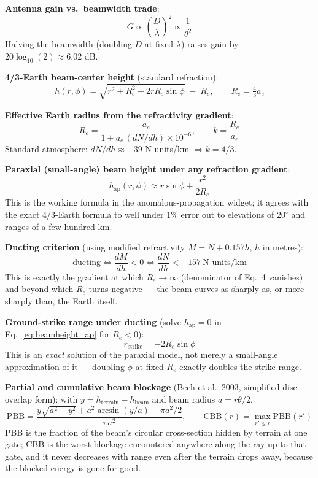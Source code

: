 \documentclass[11pt]{article}
\begin{document}
\textbf{Antenna gain vs.\ beamwidth trade}:
\begin{equation}
G \propto \left(\frac{D}{\lambda}\right)^2 \propto \frac{1}{\theta^2}
\end{equation}
Halving the beamwidth (doubling $D$ at fixed $\lambda$) raises gain by $20\log_{10}(2) \approx 6.02$ dB.

\textbf{4/3-Earth beam-center height} (standard refraction):
\begin{equation}
h(r,\phi) = \sqrt{r^2 + R_e^2 + 2 r R_e \sin\phi} \;-\; R_e, \qquad R_e = \tfrac{4}{3}a_e
\end{equation}

\textbf{Effective Earth radius from the refractivity gradient}:
\begin{equation}
R_e = \frac{a_e}{1 + a_e\,(dN/dh)\times 10^{-6}}, \qquad k = \frac{R_e}{a_e}
\end{equation}
Standard atmosphere: $dN/dh \approx -39$ N-units/km $\Rightarrow k = 4/3$.

\textbf{Paraxial (small-angle) beam height under any refraction gradient}:
\begin{equation}
h_{\mathrm{ap}}(r,\phi) \approx r\sin\phi + \frac{r^2}{2R_e}
\label{eq:beamheight_ap}
\end{equation}
This is the working formula in the anomalous-propagation widget; it agrees with the exact 4/3-Earth formula to well under $1\%$ error out to elevations of $20^\circ$ and ranges of a few hundred km.

\textbf{Ducting criterion} (using modified refractivity $M = N + 0.157h$, $h$ in metres):
\begin{equation}
\text{ducting} \iff \frac{dM}{dh} < 0 \iff \frac{dN}{dh} < -157\ \text{N-units/km}
\end{equation}
This is exactly the gradient at which $R_e \to \infty$ (denominator of Eq.~4 vanishes) and beyond which $R_e$ turns negative --- the beam curves as sharply as, or more sharply than, the Earth itself.

\textbf{Ground-strike range under ducting} (solve $h_\mathrm{ap}=0$ in Eq.~\ref{eq:beamheight_ap} for $R_e<0$):
\begin{equation}
r_{\mathrm{strike}} = -2R_e\sin\phi
\end{equation}
This is an \emph{exact} solution of the paraxial model, not merely a small-angle approximation of it --- doubling $\phi$ at fixed $R_e$ exactly doubles the strike range.

\textbf{Partial and cumulative beam blockage} (Bech et al.\ 2003, simplified disc-overlap form): with $y = h_{\mathrm{terrain}} - h_{\mathrm{beam}}$ and beam radius $a = r\theta/2$,
\begin{equation}
\mathrm{PBB} = \frac{y\sqrt{a^2-y^2} + a^2\arcsin(y/a) + \pi a^2/2}{\pi a^2},\qquad \mathrm{CBB}(r) = \max_{r'\le r}\mathrm{PBB}(r')
\end{equation}
PBB is the fraction of the beam's circular cross-section hidden by terrain at one gate; CBB is the worst blockage encountered anywhere along the ray up to that gate, and it never decreases with range even after the terrain drops away, because the blocked energy is gone for good.
\end{document}
